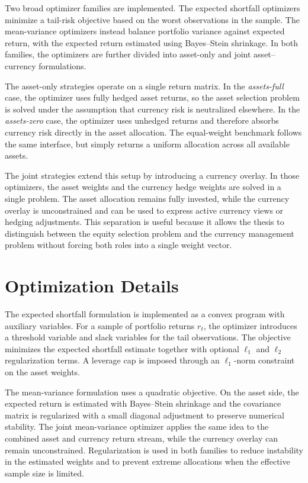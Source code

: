 Two broad optimizer families are implemented. The expected shortfall optimizers minimize a tail-risk objective based on the worst observations in the sample. The mean-variance optimizers instead balance portfolio variance against expected return, with the expected return estimated using Bayes--Stein shrinkage. In both families, the optimizers are further divided into asset-only and joint asset--currency formulations.

The asset-only strategies operate on a single return matrix. In the \emph{assets-full} case, the optimizer uses fully hedged asset returns, so the asset selection problem is solved under the assumption that currency risk is neutralized elsewhere. In the \emph{assets-zero} case, the optimizer uses unhedged returns and therefore absorbs currency risk directly in the asset allocation. The equal-weight benchmark follows the same interface, but simply returns a uniform allocation across all available assets.

The joint strategies extend this setup by introducing a currency overlay. In those optimizers, the asset weights and the currency hedge weights are solved in a single problem. The asset allocation remains fully invested, while the currency overlay is unconstrained and can be used to express active currency views or hedging adjustments. This separation is useful because it allows the thesis to distinguish between the equity selection problem and the currency management problem without forcing both roles into a single weight vector.

\section{Optimization Details}

The expected shortfall formulation is implemented as a convex program with auxiliary variables. For a sample of portfolio returns \(r_t\), the optimizer introduces a threshold variable and slack variables for the tail observations. The objective minimizes the expected shortfall estimate together with optional \(\ell_1\) and \(\ell_2\) regularization terms. A leverage cap is imposed through an \(\ell_1\)-norm constraint on the asset weights.

The mean-variance formulation uses a quadratic objective. On the asset side, the expected return is estimated with Bayes--Stein shrinkage and the covariance matrix is regularized with a small diagonal adjustment to preserve numerical stability. The joint mean-variance optimizer applies the same idea to the combined asset and currency return stream, while the currency overlay can remain unconstrained. Regularization is used in both families to reduce instability in the estimated weights and to prevent extreme allocations when the effective sample size is limited.

